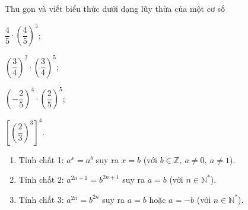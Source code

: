 \begin{vd}
Thu gọn và viết biểu thức dưới dạng lũy thừa của một cơ số
\begin{listEX}[4]
	\item $ \dfrac{4}{5} \cdot \left(\dfrac{4}{5}\right)^5 $;
	\item $ \left(\dfrac{3}{4}\right)^2 \cdot \left(\dfrac{3}{4}\right)^5$;
	\item $ \left(-\dfrac{2}{5}\right)^4 \cdot \left(\dfrac{2}{5}\right)^5$;
	\item $ \left[\left(\dfrac{2}{3}\right)^3\right]^4 $.
\end{listEX}	
\end{vd}
\begin{dang}
	\begin{enumerate}[\tickEX]
		\item Tính chất 1: $ a^x = a^b $ suy ra $ x = b $ (với $ b \in \mathbb{Z}, \ a \ne 0, \ a \ne 1 $).
		\item  Tính chất 2:  $ a^{2n+1} = b^{2n+1} $ suy ra $ a = b $ (với $ n \in \mathbb{N}^*$).
		\item  Tính chất 3:  $ a^{2n} = b^{2n} $ suy ra $ a = b $ hoặc $ a = -b $ (với $ n \in \mathbb{N}^*$).
	\end{enumerate}
\end{dang}
